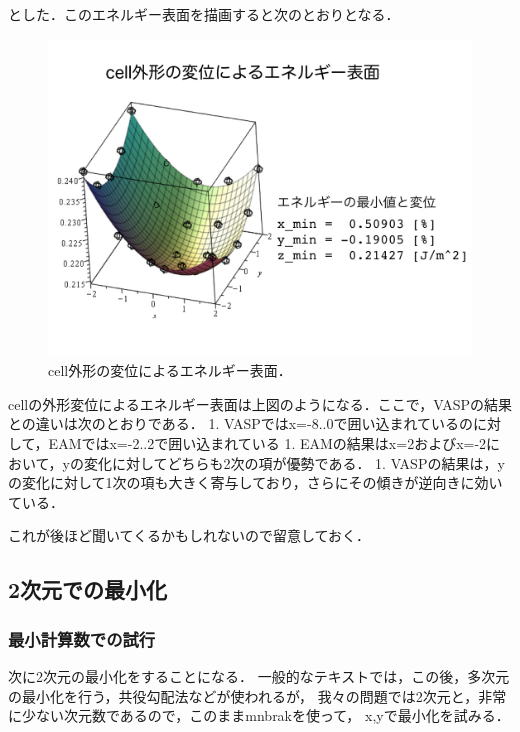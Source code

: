 \documentclass[11pt,dvipdfmx]{jsarticle}
\begin{document}
とした．このエネルギー表面を描画すると次のとおりとなる．

\begin{figure}[H][htbp]
\centering
\begin{center}
\includegraphics[width=150mm]{../.././figs/thesis/thesis_007.jpeg}
\end{center}
\caption{cell外形の変位によるエネルギー表面．\label{spandata-label}}

\label{fig:}
\end{figure}

    cellの外形変位によるエネルギー表面は上図のようになる．ここで，VASPの結果との違いは次のとおりである．
1.
VASPではx=-8..0で囲い込まれているのに対して，EAMではx=-2..2で囲い込まれている
1.
EAMの結果はx=2およびx=-2において，yの変化に対してどちらも2次の項が優勢である．
1.
VASPの結果は，yの変化に対して1次の項も大きく寄与しており，さらにその傾きが逆向きに効いている．

これが後ほど聞いてくるかもしれないので留意しておく．

    \subsection{2次元での最小化}\label{ux6b21ux5143ux3067ux306eux6700ux5c0fux5316}

\subsubsection{最小計算数での試行}\label{ux6700ux5c0fux8a08ux7b97ux6570ux3067ux306eux8a66ux884c}

次に2次元の最小化をすることになる．
一般的なテキストでは，この後，多次元の最小化を行う，共役勾配法などが使われるが，
我々の問題では2次元と，非常に少ない次元数であるので，このままmnbrakを使って，
x,yで最小化を試みる．
\end{document}
